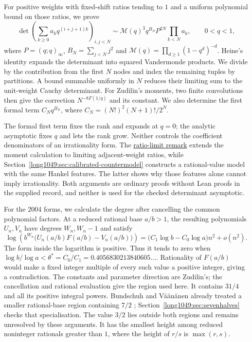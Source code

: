 \documentclass[11pt]{article}
\begin{document}
For positive weights with fixed-shift ratios tending to $1$ and a
uniform polynomial bound on those ratios, we prove
\[
 \det\left(\sum_{k\ge0}a_kq^{(i+j+1)k}\right)_{i,j<N}
 \sim\mathcal M(q)^3q^{B_N}P^{2N}\prod_{k<N}a_k,
 \qquad 0<q<1,
\]
where $P=(q;q)_\infty$, $B_N=\sum_{j<N}j^2$ and
$\mathcal M(q)=\prod_{d\ge1}(1-q^d)^{-d}$.
Heine's identity expands the determinant into squared Vandermonde
products. We divide by the contribution from the first $N$ nodes
and index the remaining tuples by partitions. A bound summable
uniformly in $N$ reduces their limiting sum to the unit-weight
Cauchy determinant. For Zudilin's moments, two finite convolutions
then give the correction $N^{-8F(1/q)}$ and its constant.
We also determine the first formal term $C_Nq^{B_N}$, where
$C_N=(N!)^2(N+1)!/2^N$.

The formal first term fixes the rank and expands at $q=0$;
the analytic asymptotic fixes $q$ and lets the rank grow. Neither
controls the coefficient denominators of an irrationality form.
The \hyperref[long1049:thm:geometric-ratio]{ratio-limit remark}
extends the moment calculation to limiting adjacent-weight ratios,
while Section~\ref{long1049:sec:calibrated-countermodel} constructs
a rational-value model with the same Hankel features. The latter
shows why those features alone cannot imply irrationality. Both
arguments are ordinary proofs without Lean proofs in the supplied
record, and neither is used for the checked determinant asymptotic.

For the 2004 forms, we calculate the degree after cancelling the
common polynomial factors. At a reduced rational base $a/b>1$,
the resulting polynomials $U_n,V_n$ have degrees $W_n,W_n-1$ and
satisfy
\[
 \log\!\left(b^{W_n}\bigl(U_n(a/b)F(a/b)-V_n(a/b)\bigr)\right)
 =\bigl(C_1\log b-C_0\log a\bigr)n^2+o(n^2).
\]
The form inside the logarithm is positive. Thus it tends to zero
when $\log b/\log a<\theta^*=C_0/C_1
=0.4056830213840605\ldots$. Rationality of $F(a/b)$ would make a
fixed integer multiple of every such value a positive integer,
giving a contradiction. The constants and parameter direction are
Zudilin's; the cancellation and rational evaluation give the region
used here. It contains $31/4$ and all its positive integral powers.
Bundschuh and V\"a\"an\"anen already treated a smaller rational-base
region containing $7/2$ \cite[Theorem~2, p.~177]{bv1994};
Section~\ref{long1049:sec:sevenhalves} checks that specialisation.
The value $3/2$
lies outside both regions and remains unresolved by these arguments.
It has the smallest height among reduced noninteger rationals
greater than $1$, where the height of $r/s$ is $\max(r,s)$.
\end{document}
